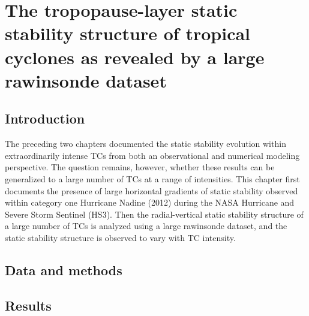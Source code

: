  
\chapter{The tropopause-layer static stability structure of tropical cyclones as revealed by a large rawinsonde dataset}
\resetfootnote %

\section{Introduction}

The preceding two chapters documented the static stability evolution within extraordinarily intense TCs from both an observational and numerical modeling perspective.
The question remains, however, whether these results can be generalized to a large number of TCs at a range of intensities.
This chapter first documents the presence of large horizontal gradients of static stability observed within category one Hurricane Nadine (2012) during the NASA Hurricane and Severe Storm Sentinel (HS3).
Then the radial-vertical static stability structure of a large number of TCs is analyzed using a large rawinsonde dataset, and the static stability structure is observed to vary with TC intensity.

\section{Data and methods}

\section{Results}

